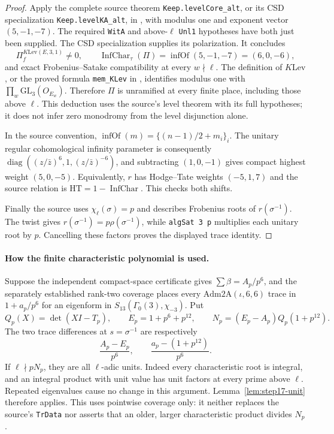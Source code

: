 \documentclass[11pt,a4paper]{article}
\theoremstyle{definition}
\begin{document}
\begin{proof}
Apply the complete source theorem \texttt{Keep.levelCore\_alt}, or its
CSD specialization \texttt{Keep.levelKA\_alt}, in
, with modulus one and exponent
vector $(5,-1,-7)$. The required \texttt{WitA} and above-$\ell$
\texttt{Unl1} hypotheses have both just been supplied. The CSD
specialization supplies its polarization. It concludes
\[
 \Pi_f^{K\mathrm{Lev}(E,3,1)}\ne0,
 \qquad \operatorname{InfChar}_\tau(\Pi)
       =\operatorname{infOf}(5,-1,-7)=(6,0,-6),
\]
and exact Frobenius--Satake compatibility at every $w\nmid\ell$.
The definition of $K\mathrm{Lev}$, or the proved formula
\texttt{mem\_KLev} in , identifies
modulus one with $\prod_w\mathrm{GL}_3(O_{E_w})$. Therefore $\Pi$ is
unramified at every finite place, including those above $\ell$.
This deduction uses the source's level theorem with its full hypotheses;
it does not infer zero monodromy from the level disjunction alone.

In the source convention,
$\operatorname{infOf}(m)=\{(n-1)/2+m_i\}_i$.
The unitary regular cohomological infinity parameter is consequently
$\operatorname{diag}((z/\bar z)^6,1,(z/\bar z)^{-6})$, and subtracting
$(1,0,-1)$ gives compact highest weight $(5,0,-5)$.
Equivalently, $r$ has Hodge--Tate weights $(-5,1,7)$ and the source relation
is $\mathrm{HT}=1-\operatorname{InfChar}$. This checks both shifts.

Finally the source uses $\chi_\ell(\sigma)=p$ and describes Frobenius
roots of $r(\sigma^{-1})$.
The twist gives $r(\sigma^{-1})=p\rho(\sigma^{-1})$, while
\texttt{algSat 3 p} multiplies each unitary root by $p$.
Cancelling these factors proves the displayed trace identity.
\end{proof}

\paragraph{How the finite characteristic polynomial is used.}
Suppose the independent compact-space certificate gives
$\sum\beta=A_p/p^6$, and the separately established rank-two coverage
places every $\mathrm{Adm2A}(\iota,6,6)$ trace in
$1+a_p/p^6$ for an eigenform in
$S_{13}(\Gamma_0(3),\chi_{-3})$. Put
\[
 Q_p(X)=\det(XI-T_p),\qquad E_p=1+p^6+p^{12},\qquad
 N_p=(E_p-A_p)Q_p(1+p^{12}).
\]
The two trace differences at $s=\sigma^{-1}$ are respectively
\[
 \frac{A_p-E_p}{p^6},\qquad
 \frac{a_p-(1+p^{12})}{p^6}.
\]
If $\ell\nmid pN_p$, they are all $\ell$-adic units. Indeed every
characteristic root is integral, and an integral product with unit value
has unit factors at every prime above $\ell$. Repeated eigenvalues cause
no change in this argument. Lemma~\ref{lem:step17-unit} therefore applies.
This uses pointwise coverage only: it neither replaces the source's
\texttt{TrData} nor asserts that an older, larger characteristic product
divides $N_p$.
\end{document}
